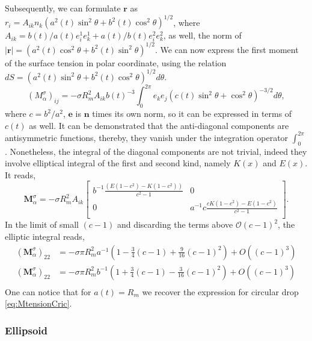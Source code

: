 Subsequently, we can formulate $\bm{r}$ as 
$r_i = A_{ik} n_k (a^2(t)\sin^2\theta+b^2(t)\cos^2\theta)^{1/2}$, 
where $A_{ik} =b(t)/a(t) e^1_ie^1_k+a(t)/b(t)e^2_ie^2_k$,
as well, the norm of $|\bm{r}| = (a^2(t)\cos^2\theta+b^2(t)\sin^2\theta)^{1/2}$.
We can now express the first moment of the surface tension in polar coordinate, using the relation 
$dS = (a^2(t)\sin^2\theta+b^2(t)\cos^2\theta)^{1/2}d\theta$.
\begin{equation*}
    (M_{\alpha}^\sigma)_{ij} 
    = - \sigma R_m^2 A_{ik} b(t)^{-3}\int_{0}^{2\pi}
    e_k  e_j 
    (c(t)\sin^2\theta+\cos^2\theta)^{-3/2} 
    d\theta,
\end{equation*}
where $c = b^2/a^2$, $\bm{e}$ is $\bm{n}$ times its own norm, so it can be expressed in terms of $c(t) $ as well. 
It can be demonstrated that the anti-diagonal components are antisymmetric functions, thereby, they vanish under the integration operator $\int_0^{2\pi}$. 
Nonetheless, the integral of the diagonal components are not trivial, indeed they involve elliptical integral of the first and second kind, namely $K(x)$ and $E(x)$. It reads,
\begin{equation*}
    \bm{M}_{\alpha}^\sigma
    = - \sigma R_m^2 A_{ik} \left[    
        \begin{matrix}
            b^{-1} \frac{(E(1 - c^2) - K(1 - c^2))}{c^2-1} & 0\\
            0 & a^{-1} c\frac{cK(1 - c^2) - E(1 - c^2)}{c^2-1}\\
        \end{matrix}
    \right].
\end{equation*}
In the limit of small $(c-1)$ and discarding the terms above $\mathcal{O}(c-1)^2$, the elliptic integral reads,
\begin{align*}
    (\bm{M}_{\alpha}^\sigma)_{22}
    &= - \sigma \pi R_m^2 
            a^{-1} (1 -\frac{3}{4}   (c-1)+\frac{9}{16}   (c-1)^2 )
    +O\left((c-1)^3\right)\\
    (\bm{M}_{\alpha}^\sigma)_{22}
    &= - \sigma \pi R_m^2 
            b^{-1} (1 +\frac{3}{4}   (c-1)-\frac{3}{16}   (c-1)^2)
    +O\left((c-1)^3\right)\\
    \label{eq:momentSigma}
\end{align*}
One can notice that for $a(t) = R_m$ we recover the expression for circular drop \ref{eq:MtensionCric}.
\subsubsection*{Ellipsoid}

